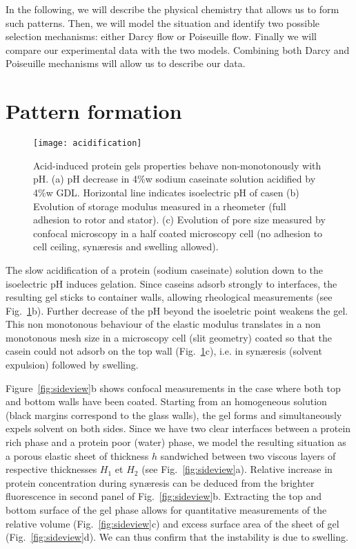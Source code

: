 \documentclass[twocolumn,superscriptaddress,showpacs,preprintnumbers,
amsmath,amssymb,prl]{revtex4-1}
\begin{document}
In the following, we will describe the physical chemistry that allows us to form such patterns. Then, we will model the situation and identify two possible selection mechanisms: either Darcy flow or Poiseuille flow. Finally we will compare our experimental data with the two models. Combining both Darcy and Poiseuille mechanisms will allow us to describe our data.

\section*{Pattern formation}

\begin{figure}[b]
	\texttt{[image: acidification]}
	\caption{Acid-induced protein gels properties behave non-monotonously with pH. (a) pH decrease in 4\%w sodium caseinate solution acidified by 4\%w GDL. Horizontal line indicates isoelectric pH of casen (b) Evolution of storage modulus measured in a rheometer (full adhesion to rotor and stator). (c) Evolution of pore size measured by confocal microscopy in a half coated microscopy cell (no adhesion to cell ceiling, syn\ae{}resis and swelling allowed).}
	\label{fig:acidification}
\end{figure}

The slow acidification of a protein (sodium caseinate) solution down to the isoelectric pH induces gelation. Since caseins adsorb strongly to interfaces, the resulting gel sticks to container walls, allowing rheological measurements (see Fig.~\ref{fig:acidification}b). Further decrease of the pH beyond the isoeletric point weakens the gel. This non monotonous behaviour of the elastic modulus translates in a non monotonous mesh size in a microscopy cell (slit geometry) coated so that the casein could not adsorb on the top wall (Fig.~\ref{fig:acidification}c), i.e. in syn\ae{}resis (solvent expulsion) followed by swelling.

Figure~\ref{fig:sideview}b shows confocal measurements in the case where both top and bottom walls have been coated. Starting from an homogeneous solution (black margins correspond to the glass walls), the gel forms and simultaneously expels solvent on both sides. Since we have two clear interfaces between a protein rich phase and a protein poor (water) phase, we model the resulting situation as a porous elastic sheet of thickness $h$ sandwiched between two viscous layers of respective thicknesses $H_1$ et $H_2$ (see Fig.~\ref{fig:sideview}a). Relative increase in protein concentration during syn\ae{}resis can be deduced from the brighter fluorescence in second panel of Fig.~\ref{fig:sideview}b. Extracting the top and bottom surface of the gel phase allows for quantitative measurements of the relative volume (Fig.~\ref{fig:sideview}c) and excess surface area of the sheet of gel (Fig.~\ref{fig:sideview}d). We can thus confirm that the instability is due to swelling.
\end{document}
